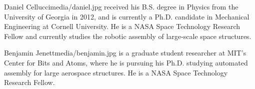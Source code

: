 \documentclass[twocolumn,letterpaper]{IEEEAerospaceCLS}  %
\begin{document}



\thebiography
\begin{biographywithpic}
{Daniel Cellucci}{media/daniel.jpg}
received his B.S. degree in Physics from the University of Georgia in 2012, and is currently a Ph.D. candidate in Mechanical Engineering at Cornell University. He is a NASA Space Technology Research Fellow and currently studies the robotic assembly of large-scale space structures.
\end{biographywithpic} 

\begin{biographywithpic}
{Benjamin Jenett}{media/benjamin.jpg}
is a graduate student researcher at MIT’s Center for Bits and Atoms, where he is pursuing his Ph.D. studying automated assembly for large aerospace structures. He is a NASA Space Technology Research Fellow.

\end{biographywithpic}
\end{document}

